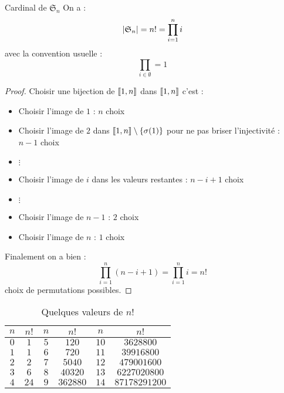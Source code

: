 \documentclass{cours}
\begin{document}
\begin{propositionfr}{Cardinal de $\mathfrak{S}_{n}$}
    On a\! :
    \[
        \left|\mathfrak{S}_{n}\right| = n! = \prod_{i = 1}^{n} i
    \]
    avec la convention usuelle\! :
    \[
        \prod_{i \in \emptyset} = 1
    \]
\end{propositionfr}
\begin{proof}
    Choisir une bijection de $\left\llbracket 1, n\right\rrbracket$ dans $\left\llbracket 1, n\right\rrbracket$ c'est\! :
    \begin{itemize}
        \item Choisir l'image de $1$\! : $n$ choix
        \item Choisir l'image de $2$ dans $\left\llbracket 1, n\right\rrbracket\setminus \left\{\sigma(1)\right\}$ pour ne pas briser l'injectivité\! : $n - 1$ choix
        \item $\vdots$
        \item Choisir l'image de $i$ dans les valeurs restantes\! : $n - i + 1$ choix
        \item $\vdots$
        \item Choisir l'image de $n - 1$\! : $2$ choix
        \item Choisir l'image de $n$\! : $1$ choix
    \end{itemize}
    Finalement on a bien\! :
    \[
        \prod_{i = 1}^{n} (n - i + 1) = \prod_{i = 1}^{n} i = n!
    \]
    choix de permutations possibles.
\end{proof}

\begin{table}
    \begin{center}
        \begin{tabular}{cc|cc|cc}
            \toprule
            $n$ & $n!$ & $n$ & $n!$     & $n$  & $n!$          \\
            \midrule
            $0$ & $1$  & $5$ & $120$    & $10$ & $3628800$     \\
            $1$ & $1$  & $6$ & $720$    & $11$ & $39916800$    \\
            $2$ & $2$  & $7$ & $5040$   & $12$ & $479001600$   \\
            $3$ & $6$  & $8$ & $40320$  & $13$ & $6227020800$  \\
            $4$ & $24$ & $9$ & $362880$ & $14$ & $87178291200$ \\
            \bottomrule
        \end{tabular}
    \end{center}
    \caption{Quelques valeurs de $n!$}
\end{table}
\end{document}
